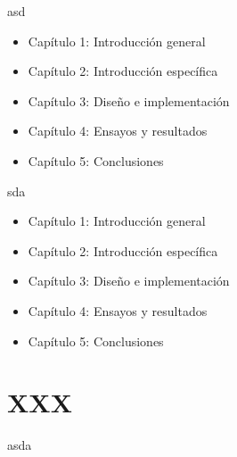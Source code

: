 asd

\begin{itemize}
\item Capítulo 1: Introducción general	
\item Capítulo 2: Introducción específica
\item Capítulo 3: Diseño e implementación
\item Capítulo 4: Ensayos y resultados
\item Capítulo 5: Conclusiones
\end{itemize}

sda

\begin{itemize}
\item Capítulo 1: Introducción general	
\item Capítulo 2: Introducción específica
\item Capítulo 3: Diseño e implementación
\item Capítulo 4: Ensayos y resultados
\item Capítulo 5: Conclusiones
\end{itemize}



\section{XXX}

asda
 

